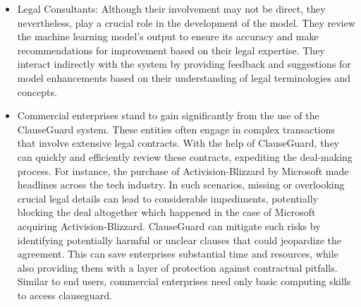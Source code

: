 \begin{itemize}
    \item Legal Consultants: Although their involvement may not be direct, they nevertheless, play a crucial role in the development of the model. They review the machine learning model's output to ensure its accuracy and make recommendations for improvement based on their legal expertise. They interact indirectly with the system by providing feedback and suggestions for model enhancements based on their understanding of legal terminologies and concepts.
    \item Commercial enterprises stand to gain significantly from the use of the ClauseGuard system. These entities often engage in complex transactions that involve extensive legal contracts. With the help of ClauseGuard, they can quickly and efficiently review these contracts, expediting the deal-making process. For instance,  the  purchase of Activision-Blizzard by Microsoft made headlines across the tech industry. In such scenarios, missing or overlooking crucial legal details can lead to considerable impediments, potentially blocking the deal altogether which happened in the case of Microsoft acquiring Activision-Blizzard. ClauseGuard can mitigate such risks by identifying potentially harmful or unclear clauses that could jeopardize the agreement. This can save enterprises substantial time and resources, while also providing them with a layer of protection against contractual pitfalls. Similar to end users, commercial enterprises need only basic computing skills to access clauseguard. 

\end{itemize}


